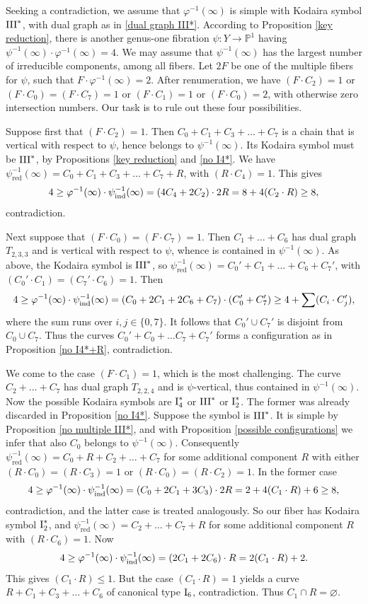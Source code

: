 \documentclass[oneside, 12pt]{amsart}
\theoremstyle{definition}
\theoremstyle{remark}
\newcommand{\PP}{\mathbb{P}}
\newcommand{\I}{\text{\rm I}}
\newcommand{\III}{\text{\rm III}}
\newcommand{\ra}{\rightarrow}
\newcommand{\red}{{\operatorname{red}}}
\newcommand{\ind}{\text{\rm ind}}
\newcommand{\inv}{{-1}}
\begin{document}
\proof
Seeking a contradiction, we assume  that $\varphi^{-1}(\infty)$
is simple with Kodaira symbol $\III^*$, with dual graph as in \eqref{dual graph III*}.
According to Proposition \ref{key reduction}, 
there is another genus-one fibration $\psi:Y\ra\PP^1$ having $\psi^{-1}(\infty)\cdot\varphi^{-1}(\infty)=4$.
We may assume that  $\psi^{-1}(\infty)$ has the largest number of irreducible components, among all fibers.
Let $2F$ be one of the multiple fibers for $\psi$, such that $F\cdot \varphi^\inv(\infty)=2$.
After renumeration, we have  $(F\cdot C_2)=1$ or    $(F\cdot C_0)=(F\cdot C_7)=1$ or $(F\cdot C_1)=1$ or $(F\cdot C_0)=2$, with otherwise zero intersection numbers.
Our task is to rule out these four possibilities.

Suppose first that $(F\cdot C_2)=1$. Then $C_0+C_1+C_3+\ldots+C_7$ is a chain that is vertical with respect to $\psi$,
hence belongs to $\psi^{-1}(\infty)$. 
Its Kodaira symbol must be $\III^*$, by Propositions \ref{key reduction} and \ref{no I4*}.
We have $\psi^\inv_\red(\infty)= C_0+C_1+C_3+\ldots+C_7+R$,
with $(R\cdot C_4)=1$. This gives 
$$
4\geq \varphi^{-1}(\infty)\cdot \psi^\inv_\ind(\infty) = (4C_4+2C_2)\cdot 2R =8+ 4(C_2\cdot R)\geq 8,
$$
contradiction.

Next suppose that $(F\cdot C_0)=(F\cdot C_7)=1$. Then $C_1+\ldots+C_6$ has dual graph $T_{2,3,3}$ and is vertical with
respect to $\psi$, whence is contained in $\psi^\inv(\infty)$.
As above, the Kodaira symbol is $\III^*$, 
so $\psi^\inv_\red(\infty) = C_0'+C_1+\ldots+C_6+C_7'$, with $(C_0'\cdot C_1)=(C_7'\cdot C_6)=1$. Then
$$
4\geq \varphi^{-1}(\infty)\cdot \psi^\inv_\ind(\infty) = (C_0+2C_1+2C_6+C_7)\cdot(C_0'+C_7') \geq  4+  \sum (C_i\cdot C_j'),
$$
where the sum runs over $i,j\in \{0,7\}$. It follows that $C_0'\cup C_7'$ is disjoint from $C_0\cup C_7$.
Thus the curves $C_0'+C_0+\ldots C_7+C_7'$ forms a configuration as in Proposition \ref{no I4*+R}, contradiction.

We come to  the case $(F\cdot C_1)=1$, which is the most challenging.
The curve $C_2+\ldots+C_7$ has dual graph $T_{2,2,4}$ and is $\psi$-vertical, thus contained in $\psi^\inv(\infty)$.
Now the possible Kodaira symbols are  $\I_4^*$ or $\III^*$  or $\I_2^*$. 
The former was already discarded in  Proposition \ref{no I4*}. 
Suppose the symbol is $\III^*$.  It is simple by Proposition \ref{no multiple III*}, 
and with Proposition \ref{possible configurations} we infer that
also $C_0$ belongs to $\psi^\inv(\infty)$. Consequently  $\psi_\red^{-1}(\infty)=C_0+R+C_2+\ldots+C_7$ for some additional component $R$
with either $(R\cdot C_0)=(R\cdot C_3)=1$ or $(R\cdot C_0)=(R\cdot C_2)=1$.  In the former case
$$
4\geq \varphi^{-1}(\infty)\cdot \psi^\inv_\ind(\infty) = (C_0+2C_1+3C_3)\cdot 2R = 2 + 4(C_1\cdot R) + 6\geq 8,
$$
contradiction, and the latter case is treated analogously. So our fiber has Kodaira symbol $\I_2^*$,
and $\psi^\inv_\red(\infty)=C_2+\ldots+C_7+R$ for some additional component $R$ with $(R\cdot C_6)=1$. Now
$$
4\geq \varphi^{-1}(\infty)\cdot \psi^\inv_\ind(\infty) = (2C_1+ 2C_6)\cdot R = 2(C_1\cdot R) + 2.
$$
This gives $(C_1\cdot R)\leq 1$. But the case $(C_1\cdot R)=1$ yields a curve $R+C_1+C_3+\ldots+C_6$ of canonical type $\I_6$,
contradiction. Thus $C_1\cap R=\varnothing$.
\end{document}
